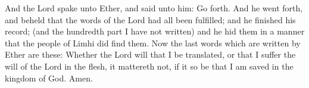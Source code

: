 \bverse \iffalse And the Lord spake unto Ether, and said unto him: Go forth.  And he went forth, and beheld that the words of the Lord had all been fulfilled; and he finished his record; (and the hundredth part I have not written) and he hid them in a manner that the people of Limhi did find them. \fi
And the Lord spake unto Ether, and said unto him: Go forth.  And he went forth, and beheld that the words of the Lord had all been fulfilled; and he finished his record; (and the hundredth part I have not written) and he hid them in a manner that the people of Limhi did find them.
\bverse \iffalse Now the last words which are written by Ether are these: Whether the Lord will that I be translated, or that I suffer the will of the Lord in the flesh, it mattereth not, if it so be that I am saved in the kingdom of God. Amen. \fi
Now the last words which are written by Ether are these: Whether the Lord will that I be translated, or that I suffer the will of the Lord in the flesh, it mattereth not, if it so be that I am saved in the kingdom of God. Amen.
